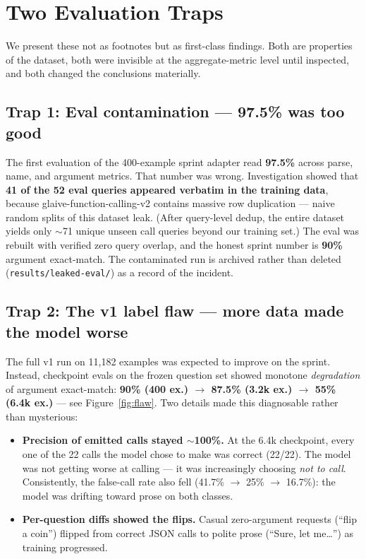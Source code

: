 \documentclass[10pt]{article}
\begin{document}
\section{Two Evaluation Traps}
\label{sec:traps}

We present these not as footnotes but as first-class findings. Both are properties of
the dataset, both were invisible at the aggregate-metric level until inspected, and both
changed the conclusions materially.

\subsection{Trap 1: Eval contamination --- 97.5\% was too good}
\label{sec:contamination}

The first evaluation of the 400-example sprint adapter read \textbf{97.5\%} across parse,
name, and argument metrics. That number was wrong. Investigation showed that
\textbf{41 of the 52 eval queries appeared verbatim in the training data}, because
glaive-function-calling-v2 contains massive row duplication --- naive random splits of
this dataset leak. (After query-level dedup, the entire dataset yields only $\sim$71
unique unseen call queries beyond our training set.) The eval was rebuilt with verified
zero query overlap, and the honest sprint number is \textbf{90\%} argument exact-match.
The contaminated run is archived rather than deleted
(\texttt{results/leaked-eval/}) as a record of the incident.

\subsection{Trap 2: The v1 label flaw --- more data made the model worse}
\label{sec:flaw}

The full v1 run on 11{,}182 examples was expected to improve on the sprint. Instead,
checkpoint evals on the frozen question set showed monotone \emph{degradation} of
argument exact-match: \textbf{90\% (400 ex.) $\rightarrow$ 87.5\% (3.2k ex.)
$\rightarrow$ 55\% (6.4k ex.)} --- see Figure~\ref{fig:flaw}. Two details made this
diagnosable rather than mysterious:

\begin{itemize}
\item \textbf{Precision of emitted calls stayed $\sim$100\%.} At the 6.4k checkpoint,
  every one of the 22 calls the model chose to make was correct (22/22). The model was
  not getting worse at calling --- it was increasingly choosing \emph{not to call}.
  Consistently, the false-call rate also fell (41.7\% $\rightarrow$ 25\% $\rightarrow$
  16.7\%): the model was drifting toward prose on both classes.
\item \textbf{Per-question diffs showed the flips.} Casual zero-argument requests
  (``flip a coin'') flipped from correct JSON calls to polite prose
  (``Sure, let me\ldots'') as training progressed.
\end{itemize}
\end{document}
